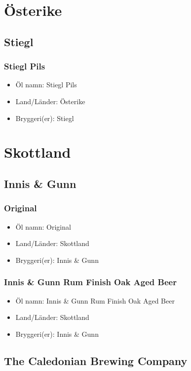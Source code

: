 \documentclass[11pt]{article}
\begin{document}
\section{Österike}
\label{sec:org9c0700c}
\subsection{Stiegl}
\label{sec:org53ed660}
\subsubsection{Stiegl Pils}
\label{sec:orgb17813f}
\begin{itemize}
\item Öl namn: Stiegl Pils
\item Land/Länder: Österike
\item Bryggeri(er): Stiegl
\end{itemize}
\section{Skottland}
\label{sec:org1f11d8a}
\subsection{Innis \& Gunn}
\label{sec:orgaaf9f32}
\subsubsection{Original}
\label{sec:org2d1f1e7}
\begin{itemize}
\item Öl namn: Original
\item Land/Länder: Skottland
\item Bryggeri(er): Innis \& Gunn
\end{itemize}
\subsubsection{Innis \& Gunn Rum Finish Oak Aged Beer}
\label{sec:orgbcbde6e}
\begin{itemize}
\item Öl namn: Innis \& Gunn Rum Finish Oak Aged Beer
\item Land/Länder: Skottland
\item Bryggeri(er): Innis \& Gunn
\end{itemize}
\subsection{The Caledonian Brewing Company}
\label{sec:org8dc0eee}
\end{document}
